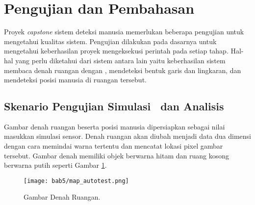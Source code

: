 \section{Pengujian dan Pembahasan}
\label{sec:pengujian}

Proyek \textit{capstone} sistem deteksi manusia memerlukan beberapa pengujian untuk mengetahui kualitas sistem. Pengujian dilakukan pada dasarnya untuk mengetahui keberhasilan proyek mengeksekusi perintah pada setiap tahap. Hal-hal yang perlu diketahui dari sistem antara lain yaitu keberhasilan sistem membaca denah ruangan dengan \lidar, mendeteksi bentuk garis dan lingkaran, dan mendeteksi posisi manusia di ruangan tersebut.

\subsection{Skenario Pengujian Simulasi \lidar\ dan Analisis}
\label{subsec:Skenario51}
Gambar denah ruangan beserta posisi manusia dipersiapkan sebagai nilai masukkan simulasi sensor. Denah ruangan akan diubah menjadi data dua dimensi dengan cara memindai warna tertentu dan mencatat lokasi pixel gambar tersebut. Gambar denah memiliki objek berwarna hitam dan ruang kosong berwarna putih seperti Gambar \ref*{fig:Ch05_denah}.
\begin{figure}[H]
    \centering
    \texttt{[image: bab5/map\_autotest.png]}
    \caption{Gambar Denah Ruangan.}
        \label{fig:Ch05_denah}
\end{figure}

